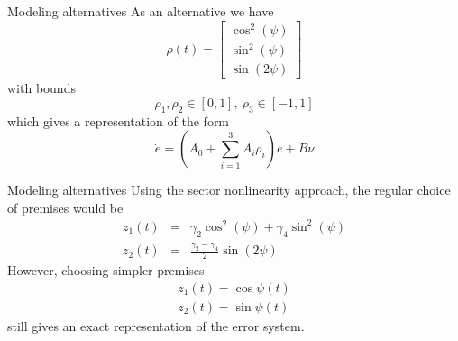 \begin{frame}{Modeling alternatives}
	As an alternative we have 
	\begin{equation} 
	\rho(t) = \begin{bmatrix}
	\cos^{2}(\psi)\\
	\sin^{2}(\psi)\\
	\sin(2\psi)
	\end{bmatrix}
	\end{equation} with bounds  
	\begin{equation} \label{eq:param_final_bounds}
	\rho_{1},\rho_{2} \in [0, 1], ~\rho_{3} \in [-1,1]
	\end{equation} 
	which gives a representation of the form
	\begin{equation} \label{eq:err_LPV_final}
	\dot{e} =  (A_{0} + \sum_{i=1}^{3}A_{i}\rho_{i})e + B\nu
	\end{equation} 
\end{frame}

\begin{frame}{Modeling alternatives}
	Using the sector nonlinearity approach, the regular choice of premises would be
	\begin{subequations}
		\begin{eqnarray}
		z_1(t)&=&	\gamma_{2}\cos^{2}(\psi) + \gamma_{4}\sin^{2}(\psi)\\
		z_2(t)&=&\frac{\gamma_{2}-\gamma_{4}}{2}\sin(2\psi)
		\end{eqnarray}
	\end{subequations}
	However, choosing simpler premises 
	\begin{subequations}
		\begin{align}
		z_1(t)=\cos{\psi(t)} \\
		z_2(t)=\sin{\psi(t)}
		\end{align}
	\end{subequations} still gives an exact representation of the error system.
\end{frame}


